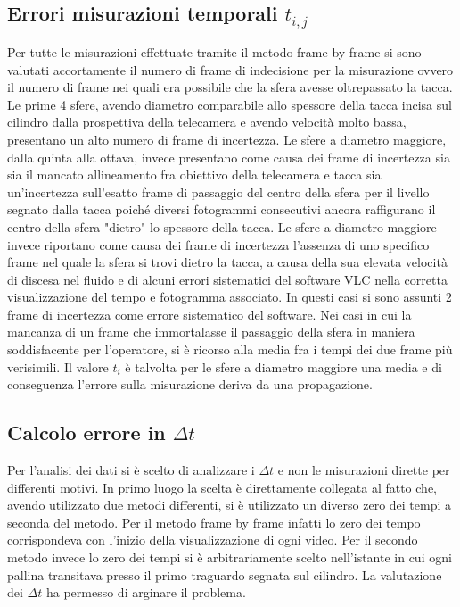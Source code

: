 \documentclass[a4paper,11pt,oneside]{article}
\begin{document}
\subsection{Errori misurazioni temporali $t_{i,j}$}
Per tutte le misurazioni effettuate tramite il metodo frame-by-frame si sono valutati accortamente il numero di frame di indecisione per la misurazione ovvero il numero di frame nei quali era possibile che la sfera avesse oltrepassato la tacca.
Le prime 4 sfere, avendo diametro comparabile allo spessore della tacca incisa sul cilindro dalla prospettiva della telecamera e avendo velocità molto bassa, presentano un alto numero di frame di incertezza.
Le sfere a diametro maggiore, dalla quinta alla ottava, invece presentano come causa dei frame di incertezza sia sia il mancato allineamento fra obiettivo della telecamera e tacca sia un'incertezza sull'esatto frame di passaggio del centro della sfera per il livello segnato dalla tacca poiché diversi fotogrammi consecutivi ancora raffigurano il centro della sfera "dietro" lo spessore della tacca.
Le sfere a diametro maggiore invece riportano come causa dei frame di incertezza l'assenza di uno specifico frame nel quale la sfera si trovi dietro la tacca, a causa della sua elevata velocità di discesa nel fluido e di alcuni errori sistematici del software VLC nella corretta visualizzazione del tempo e fotogramma associato. In questi casi si sono assunti 2 frame di incertezza come errore sistematico del software. Nei casi in cui la mancanza di un frame che immortalasse il passaggio della sfera in maniera soddisfacente per l'operatore, si è ricorso alla media fra i tempi dei due frame più verisimili. Il valore $t_i$ è talvolta per le sfere a diametro maggiore una media e di conseguenza l'errore sulla misurazione deriva da una propagazione. 



\subsection{Calcolo errore in $\Delta t$}
Per l'analisi dei dati si è scelto di analizzare i $\Delta t$ e non le misurazioni dirette per differenti motivi. In primo luogo la scelta è direttamente collegata al fatto che, avendo utilizzato due metodi differenti, si è utilizzato un diverso zero dei tempi a seconda del metodo. Per il metodo frame by frame infatti lo zero dei tempo corrispondeva con l'inizio della visualizzazione di ogni video. Per il secondo metodo invece lo zero dei tempi si è arbitrariamente scelto nell'istante in cui ogni pallina transitava presso il primo traguardo segnata sul cilindro. La valutazione dei $\Delta t$ ha permesso di arginare il problema.\\
\end{document}
